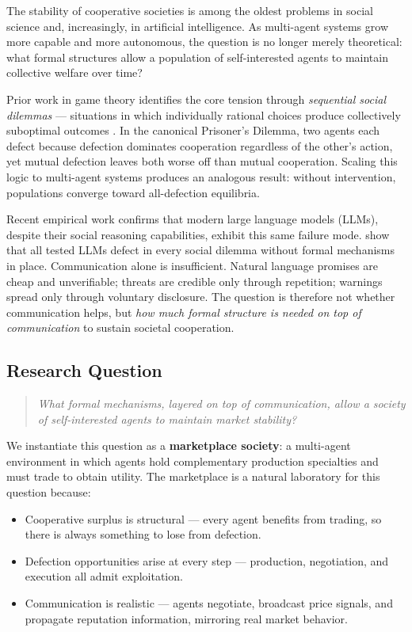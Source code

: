 \documentclass[12pt, a4paper]{article}
\begin{document}
The stability of cooperative societies is among the oldest problems in social science and, increasingly, in artificial intelligence. As multi-agent systems grow more capable and more autonomous, the question is no longer merely theoretical: what formal structures allow a population of self-interested agents to maintain collective welfare over time?

Prior work in game theory identifies the core tension through \textit{sequential social dilemmas} — situations in which individually rational choices produce collectively suboptimal outcomes \citep{coopeval}. In the canonical Prisoner's Dilemma, two agents each defect because defection dominates cooperation regardless of the other's action, yet mutual defection leaves both worse off than mutual cooperation. Scaling this logic to multi-agent systems produces an analogous result: without intervention, populations converge toward all-defection equilibria.

Recent empirical work confirms that modern large language models (LLMs), despite their social reasoning capabilities, exhibit this same failure mode. \citet{coopeval} show that all tested LLMs defect in every social dilemma without formal mechanisms in place. Communication alone is insufficient. Natural language promises are cheap and unverifiable; threats are credible only through repetition; warnings spread only through voluntary disclosure. The question is therefore not whether communication helps, but \textit{how much formal structure is needed on top of communication} to sustain societal cooperation.

\subsection{Research Question}

\begin{quote}
\textit{What formal mechanisms, layered on top of communication, allow a society of self-interested agents to maintain market stability?}
\end{quote}

We instantiate this question as a \textbf{marketplace society}: a multi-agent environment in which agents hold complementary production specialties and must trade to obtain utility. The marketplace is a natural laboratory for this question because:

\begin{itemize}
  \item Cooperative surplus is structural — every agent benefits from trading, so there is always something to lose from defection.
  \item Defection opportunities arise at every step — production, negotiation, and execution all admit exploitation.
  \item Communication is realistic — agents negotiate, broadcast price signals, and propagate reputation information, mirroring real market behavior.
\end{itemize}
\end{document}
